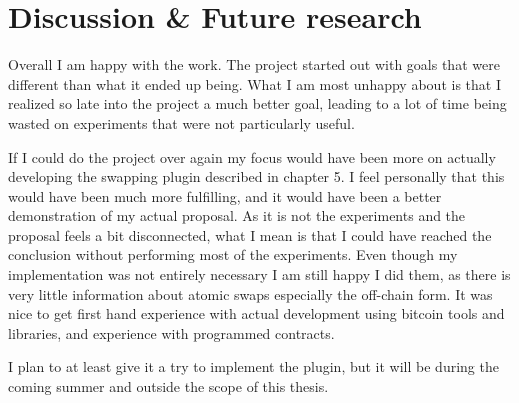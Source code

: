 \chapter{Discussion \& Future research}
Overall I am happy with the work. The project started out with goals that were different than what it ended up being. What I am most unhappy about is that I realized so late into the project a much better goal, leading to a lot of time being wasted on experiments that were not particularly useful. 

If I could do the project over again my focus would have been more on actually developing the swapping plugin described in chapter 5. I feel personally that this would have been much more fulfilling, and it would have been a better demonstration of my actual proposal. As it is not the experiments and the proposal feels a bit disconnected, what I mean is that I could have reached the conclusion without performing most of the experiments. Even though my implementation was not entirely necessary I am still happy I did them, as there is very little information about atomic swaps especially the off-chain form. It was nice to get first hand experience with actual development using bitcoin tools and libraries, and experience with programmed contracts. 

I plan to at least give it a try to implement the plugin, but it will be during the coming summer and outside the scope of this thesis. 

